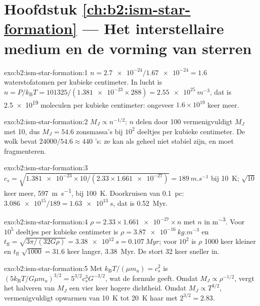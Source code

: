 \section*{Hoofdstuk \ref{ch:b2:ism-star-formation} --- Het interstellaire medium en de vorming van sterren}

\begin{solution}{exo:b2:ism-star-formation:1}
$n = \num{2.7e-24}/\num{1.67e-24} = 1.6$ waterstofatomen per kubieke centimeter. In lucht is
$n = P/k_{\mathrm B}T = 101325/(\num{1.381e-23}\times288) = \qty{2.55e25}{m^{-3}}$,
dat is \num{2.5e19} moleculen per kubieke centimeter: ongeveer $1.6\times10^{19}$ keer
meer.
\end{solution}

\begin{solution}{exo:b2:ism-star-formation:2}
$M_J \propto n^{-1/2}$: $n$ delen door 100 vermenigvuldigt $M_J$ met 10, dus
$M_J = 54.6$ zonsmassa's bij $10^2$ deeltjes per kubieke centimeter. De wolk bevat
$\num{24000}/54.6 \approx 440$ 's: ze kan als geheel niet stabiel zijn, en moet
fragmenteren.
\end{solution}

\begin{solution}{exo:b2:ism-star-formation:3}
$c_s = \sqrt{\num{1.381e-23}\times10/(2.33\times\num{1.661e-27})} =
\qty{189}{m.s^{-1}}$ bij \qty{10}{K}; $\sqrt{10}$ keer meer, \qty{597}{m.s^{-1}},
bij \qty{100}{K}. Doorkruisen van \qty{0.1}{pc}: $\num{3.086e15}/189 = \qty{1.63e13}{s}$,
dat is \qty{0.52}{Myr}.
\end{solution}

\begin{solution}{exo:b2:ism-star-formation:4}
$\rho = 2.33\times\num{1.661e-27}\times n$ met $n$ in \unit{m^{-3}}. Voor $10^5$
deeltjes per kubieke centimeter is $\rho = \qty{3.87e-16}{kg.m^{-3}}$ en
$t_{\mathrm{ff}} = \sqrt{3\pi/(32G\rho)} = \qty{3.38e12}{s} = \qty{0.107}{Myr}$; voor
$10^2$ is $\rho$ \num{1000} keer kleiner en $t_{\mathrm{ff}}$ $\sqrt{1000} = 31.6$
keer langer, \qty{3.38}{Myr}. De  stort 32 keer sneller in.
\end{solution}

\begin{solution}{exo:b2:ism-star-formation:5}
Met $k_{\mathrm B}T/(\mu m_u) = c_s^2$ is $(5k_{\mathrm B}T/G\mu m_u)^{3/2} =
5^{3/2}c_s^3G^{-3/2}$, wat de formule geeft. Omdat $M_J \propto \rho^{-1/2}$,
vergt het halveren van $M_J$ een vier keer hogere dichtheid. Omdat $M_J \propto T^{3/2}$,
vermenigvuldigt opwarmen van \qty{10}{K} tot \qty{20}{K} haar met $2^{3/2} = 2.83$.
\end{solution}

